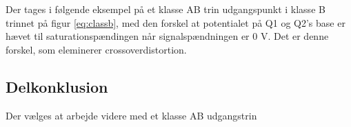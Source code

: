 Der tages i følgende eksempel på et klasse AB trin udgangspunkt i klasse B trinnet på figur \ref{eq:classb}, med den forskel at potentialet på Q1 og Q2's base er hævet til saturationspændingen når signalspændningen er 0 V. Det er denne forskel, som eleminerer crossoverdistortion.


\subsection{Delkonklusion}

Der vælges at arbejde videre med et klasse AB udgangstrin 
